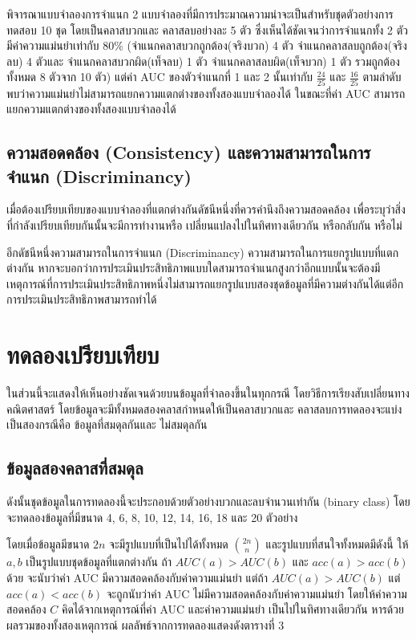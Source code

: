 \documentclass[twoside, twocolumn, 12pt]{article}
\begin{document}
พิจารณาแบบจำลองการจำแนก 2 แบบจำลองที่มีการประมาณความน่าจะเป็นสำหรับชุดตัวอย่างการทดสอบ 10 ชุด โดยเป็นคลาสบวกและ คลาสลบอย่างละ 5 ตัว ซึ่งเห็นได้ชัดเจนว่าการจำแนกทั้ง 2 ตัว มีค่าความแม่นยำเท่ากับ 80\% (จำแนกคลาสบวกถูกต้อง(จริงบวก) 4 ตัว จำแนกคลาสลบถูกต้อง(จริงลบ) 4 ตัวและ จำแนกคลาสบวกผิด(เท็จลบ) 1 ตัว จำแนกคลาสลบผิด(เท็จบวก) 1 ตัว รวมถูกต้องทั้งหมด 8 ตัวจาก 10 ตัว) แต่ค่า AUC ของตัวจำแนกที่ 1 และ 2 นั้นเท่ากับ $\frac{24}{25}$ และ $\frac{16}{25}$ ตามลำดับ 
พบว่าความแม่นยำไม่สามารถแยกความแตกต่างของทั้งสองแบบจำลองได้ ในขณะที่ค่า AUC สามารถแยกความแตกต่างของทั้งสองแบบจำลองได้

\subsection{ความสอดคล้อง (Consistency) และความสามารถในการจำแนก (Discriminancy)}
\quad เมื่อต้องเปรียบเทียบของแบบจำลองที่แตกต่างกันดัชนีหนึ่งที่ควรคำนึงถึงความสอดคล้อง เพื่อระบุว่าสิ่งที่กำลังเปรียบเทียบกันนั้นจะมีการทำงานหรือ เปลี่ยนแปลงไปในทิศทางเดียวกัน หรือกลับกัน หรือไม่

อีกดัชนีหนึ่งความสามารถในการจำแนก (Discriminancy) ความสามารถในการแยกรูปแบบที่แตกต่างกัน หากจะบอกว่าการประเมินประสิทธิภาพแบบใดสามารถจำแนกสูงกว่าอีกแบบนั้นจะต้องมีเหตุการณ์ที่การประเมินประสิทธิภาพหนึ่งไม่สามารถแยกรูปแบบสองชุดข้อมูลที่มีความต่างกันได้แต่อีกการประเมินประสิทธิภาพสามารถทำได้

\section{ทดลองเปรียบเทียบ}

\quad ในส่วนนี้จะแสดงให้เห็นอย่างชัดเจนด้วยบนข้อมูลที่จำลองขึ้นในทุกกรณี โดยวิธีการเรียงสับเปลี่ยนทางคณิตศาสตร์ โดยข้อมูลจะมีทั้งหมดสองคลาสกำหนดให้เป็นคลาสบวกและ คลาสลบการทดลองจะแบ่งเป็นสองกรณีคือ ข้อมูลที่สมดุลกันและ ไม่สมดุลกัน

\subsection{ข้อมูลสองคลาสที่สมดุล}
\quad ดังนั้นชุดข้อมูลในการทดลองนี้จะประกอบด้วยตัวอย่างบวกและลบจำนวนเท่ากัน (binary class) โดยจะทดลองข้อมูลที่มีขนาด 4, 6, 8, 10, 12, 14, 16, 18 และ 20 ตัวอย่าง

โดยเมื่อข้อมูลมีขนาด $2n$ จะมีรูปแบบที่เป็นไปได้ทั้งหมด ${{2n}\choose{n}}$ และรูปแบบที่สนใจทั้งหมดมีดังนี้ ให้ $a, b$ เป็นรูปแบบชุดข้อมูลที่แตกต่างกัน ถ้า $AUC(a) > AUC(b)$ และ $acc(a) > acc(b)$ ด้วย จะนับว่าค่า AUC มีความสอดคล้องกับค่าความแม่นยำ แต่ถ้า $AUC(a) > AUC(b)$ แต่ $acc(a) < acc(b)$ จะถูกนับว่าค่า AUC ไม่มีความสอดคล้องกับค่าความแม่นยำ โดยให้ค่าความสอดคล้อง $C$ คิดได้จากเหตุการณ์ที่ค่า AUC และค่าความแม่นยำ เป็นไปในทิศทางเดียวกัน หารด้วย ผลรวมของทั้งสองเหตุการณ์ ผลลัพธ์จากการทดลองแสดงดังตารางที่ 3
\end{document}
